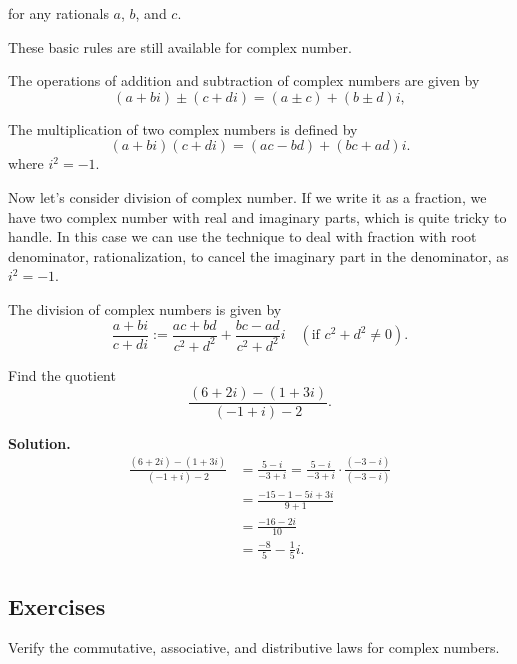 \documentclass[
	12pt, %
	fleqn, %
	a4paper, %
]{LegrandOrangeBook}
\begin{document}
for any rationals \( a \), \( b \), and \( c \).

These basic rules are still available for complex number.

\begin{definition}
    The operations of addition and subtraction of complex numbers are given by
\[
(a + bi) \pm (c + di) = (a \pm c) + (b \pm d)i,
\]
\end{definition}

\begin{definition}
    The multiplication of two complex numbers is defined by
\[
(a + bi)(c + di) = (ac - bd) + (bc + ad)i.
\]
where $i^2=-1$.
\end{definition}

Now let's consider division of complex number. If we write it as a fraction, we have two complex number with real and imaginary parts, which is quite tricky to handle.
In this case we can use the technique to deal with fraction with root denominator, rationalization, to cancel the imaginary part in the denominator, as $i^2=-1$.
\begin{definition}
    The division of complex numbers is given by
\[
\frac{a + bi}{c + di} := \frac{ac + bd}{c^2 + d^2} + \frac{bc - ad}{c^2 + d^2}i \quad (\text{if } c^2 + d^2 \neq 0).
\]
\end{definition}

\begin{example}
    Find the quotient
\[
\frac{(6 + 2i) - (1 + 3i)}{(-1 + i) - 2}.
\]
\end{example}
\textbf{Solution.}
\begin{align*}
\frac{(6 + 2i) - (1 + 3i)}{(-1 + i) - 2} &= \frac{5 - i}{-3 + i} = \frac{5 - i}{-3 + i} \cdot \frac{(-3 - i)}{(-3 - i)} \\
&= \frac{-15 - 1 - 5i + 3i}{9 + 1} \\
&= \frac{-16 - 2i}{10} \\
&= \frac{-8}{5} - \frac{1}{5}i. 
\end{align*}

\subsection{Exercises}
\begin{exercise}
    Verify the commutative, associative, and distributive laws for complex numbers.
\end{exercise}
\end{document}

